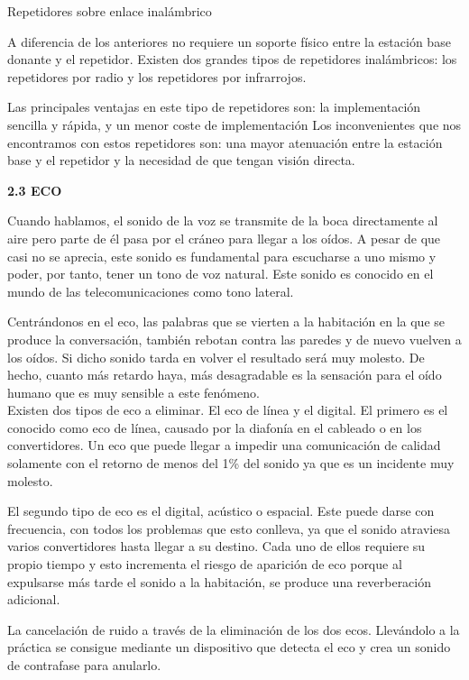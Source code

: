Repetidores sobre enlace inalámbrico

A diferencia de los anteriores no requiere un soporte físico entre la
estación base donante y el repetidor. Existen dos grandes tipos de
repetidores inalámbricos: los repetidores por radio y los repetidores
por infrarrojos.

Las principales ventajas en este tipo de repetidores son: la
implementación sencilla y rápida, y un menor coste de implementación Los
inconvenientes que nos encontramos con estos repetidores son: una mayor
atenuación entre la estación base y el repetidor y la necesidad de que
tengan visión directa.

\textbf{2.3 ECO}

Cuando hablamos, el sonido de la voz se transmite de la boca
directamente al aire pero parte de él pasa por el cráneo para llegar a
los oídos. A pesar de que casi no se aprecia, este sonido es fundamental
para escucharse a uno mismo y poder, por tanto, tener un tono de voz
natural. Este sonido es conocido en el mundo de las telecomunicaciones
como tono lateral.

Centrándonos en el eco, las palabras que se vierten a la habitación en
la que se produce la conversación, también rebotan contra las paredes y
de nuevo vuelven a los oídos. Si dicho sonido tarda en volver el
resultado será muy molesto. De hecho, cuanto más retardo haya, más
desagradable es la sensación para el oído humano que es muy sensible a
este fenómeno.\\[2\baselineskip]Existen dos tipos de eco a eliminar. El
eco de línea y el digital. El primero es el conocido como eco de línea,
causado por la diafonía en el cableado o en los convertidores. Un eco
que puede llegar a impedir una comunicación de calidad solamente con el
retorno de menos del 1\% del sonido ya que es un incidente muy molesto.

El segundo tipo de eco es el digital, acústico o espacial. Este puede
darse con frecuencia, con todos los problemas que esto conlleva, ya que
el sonido atraviesa varios convertidores hasta llegar a su destino. Cada
uno de ellos requiere su propio tiempo y esto incrementa el riesgo de
aparición de eco porque al expulsarse más tarde el sonido a la
habitación, se produce una reverberación adicional.

La cancelación de ruido a través de la eliminación de los dos ecos.
Llevándolo a la práctica se consigue mediante un dispositivo que detecta
el eco y crea un sonido de contrafase para anularlo.

